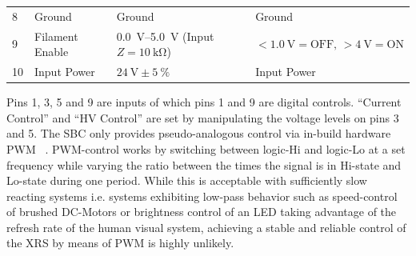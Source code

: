 \begin{table}[h]
\begin{tabular}{@{}llll@{}}
                    8&      Ground&         Ground&                                                             Ground\\
                    9&      Filament Enable&\qtyrange{0.0}{+5.0}{\volt} (Input \(Z = \qty{10}{\kilo\ohm}\))&     \(< \qty{1.0}{\volt} = \text{OFF, } >\qty{4}{\volt} = \text{ON}\)\\
                    10&     Input Power&    \(\qty{24}{\volt} \pm \qty{5}{\percent}\)&  Input Power\\
                    \bottomrule
                \end{tabular}
            \end{table}
            Pins 1, 3, 5 and 9 are inputs of which pins 1 and 9 are digital controls.
            ``Current Control'' and ``HV Control'' are set by manipulating the voltage levels on pins 3 and 5.
            The SBC only provides pseudo-analogous control via in-build hardware PWM ~\cite{Manual.Documentation.RPF}.
            PWM-control works by switching between logic-Hi and logic-Lo at a set frequency while varying the ratio between the times the signal is in Hi-state and Lo-state during one period.
            While this is acceptable with sufficiently slow reacting systems i.e. systems exhibiting low-pass behavior such as speed-control of brushed DC-Motors or brightness control of an LED taking advantage of the refresh rate of the human visual system, achieving a stable and reliable control of the XRS by means of PWM is highly unlikely.\par\medskip

